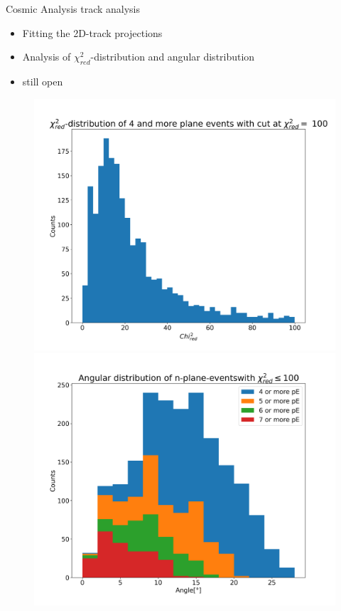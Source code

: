 \documentclass{beamer}
\begin{document}
\begin{frame}{Cosmic Analysis}
  \LARGE track analysis \normalsize \\[.1cm]
  \begin{itemize}
    \item Fitting the 2D-track projections
    \item Analysis of $\chi^2_{red}$-distribution and angular distribution
    \item still open
  \end{itemize}
  \begin{figure}[H]
    \centering
    \includegraphics[width=.49\textwidth]{track_chi}
    \includegraphics[width=.49\textwidth]{track_angle}
  \end{figure}
\end{frame}
\end{document}
